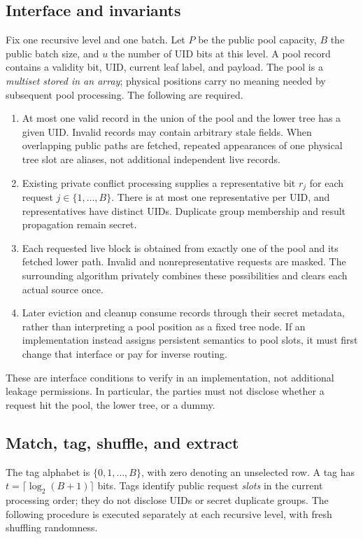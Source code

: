 \documentclass[11pt]{article}
\begin{document}
\subsection{Interface and invariants}

Fix one recursive level and one batch.  Let $P$ be the public pool capacity,
$B$ the public batch size, and $u$ the number of UID bits at this level.  A
pool record contains a validity bit, UID, current leaf label, and payload.
The pool is a \emph{multiset stored in an array}; physical positions carry no
meaning needed by subsequent pool processing.  The following are required.

\begin{enumerate}
\item At most one valid record in the union of the pool and the lower tree
has a given UID.  Invalid records may contain arbitrary stale fields.  When
overlapping public paths are fetched, repeated appearances of one physical
tree slot are aliases, not additional independent live records.
\item Existing private conflict processing supplies a representative bit
$r_j$ for each request $j\in\{1,\ldots,B\}$.  There is at most one
representative per UID, and representatives have distinct UIDs.  Duplicate
group membership and result propagation remain secret.
\item Each requested live block is obtained from exactly one of the pool
and its fetched lower path.  Invalid and nonrepresentative requests are
masked.  The surrounding algorithm privately combines these possibilities
and clears each actual source once.
\item Later eviction and cleanup consume records through their secret
metadata, rather than interpreting a pool position as a fixed tree node.
If an implementation instead assigns persistent semantics to pool slots,
it must first change that interface or pay for inverse routing.
\end{enumerate}

These are interface conditions to verify in an implementation, not additional
leakage permissions.  In particular, the parties must not disclose whether
a request hit the pool, the lower tree, or a dummy.

\subsection{Match, tag, shuffle, and extract}

The tag alphabet is $\{0,1,\ldots,B\}$, with zero denoting an unselected row.
A tag has $t=\lceil\log_2(B+1)\rceil$ bits.  Tags identify public request
\emph{slots} in the current processing order; they do not disclose UIDs or
secret duplicate groups.  The following procedure is executed separately
at each recursive level, with fresh shuffling randomness.
\end{document}
